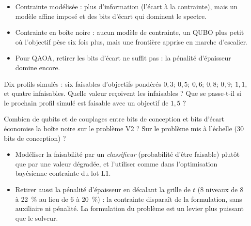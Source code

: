 \begin{resultat}
\begin{itemize}
\item Contrainte modélisée : plus d'information (l'écart à la contrainte), mais un modèle affine imposé et des bits d'écart qui dominent le spectre.
\item Contrainte en boîte noire : aucun modèle de contrainte, un QUBO plus petit où l'objectif pèse six fois plus, mais une frontière apprise en marche d'escalier.
\item Pour QAOA, retirer les bits d'écart ne suffit pas : la pénalité d'épaisseur domine encore.
\end{itemize}
\end{resultat}

\exercices
\begin{exercice}\label{ex:bn-valeur}
Dix profils simulés : six faisables d'objectifs pondérés $0{,}3;\ 0{,}5;\ 0{,}6;\ 0{,}8;\ 0{,}9;\ 1{,}1$, et quatre infaisables. Quelle valeur reçoivent les infaisables ? Que se passe-t-il si le prochain profil simulé est faisable avec un objectif de $1{,}5$ ?
\end{exercice}
\begin{exercice}\label{ex:bn-qubits}
Combien de qubits et de couplages entre bits de conception et bits d'écart économise la boîte noire sur le problème V2 ? Sur le problème mis à l'échelle (30 bits de conception) ?
\end{exercice}

\begin{pistes}
\begin{itemize}
\item Modéliser la faisabilité par un \emph{classifieur} (probabilité d'être faisable) plutôt que par une valeur dégradée, et l'utiliser comme dans l'optimisation bayésienne contrainte du lot L1.
\item Retirer aussi la pénalité d'épaisseur en décalant la grille de $t$ (8 niveaux de 8 à 22~\% au lieu de 6 à 20~\%) : la contrainte disparaît de la formulation, sans auxiliaire ni pénalité. La formulation du problème est un levier plus puissant que le solveur.
\end{itemize}
\end{pistes}
